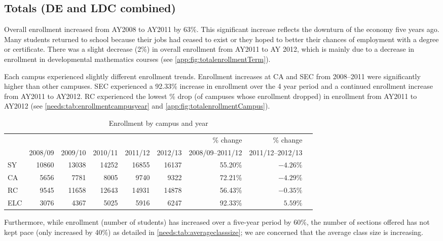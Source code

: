 \subsection{Totals (DE and LDC combined)}
Overall enrollment increased from AY2008 to AY2011 by 63\%.
This significant increase reflects the downturn of the economy five years ago.
Many students returned to school because their jobs had ceased to exist or they hoped to better their chances of employment with a degree or certificate.
There was a slight decrease (2\%) in overall enrollment from AY2011 to AY 2012, which is mainly due to a decrease in enrollment in developmental mathematics courses (see \vref{app:fig:totalenrollmentTerm}).

Each campus experienced slightly different enrollment trends.
Enrollment increases at CA and SEC from 2008--2011 were significantly higher than other campuses.
SEC experienced a 92.33\% increase in enrollment over the 4 year period and a continued enrollment increase from AY2011 to AY2012.
RC experienced the lowest \% drop (of campuses whose enrollment dropped)  in enrollment from AY2011 to AY2012 (see \vref{needs:tab:enrollmentcampusyear} and \vref{app:fig:totalenrollmentCampus}).

\begin{table}[!htb]
	\centering
	\caption{Enrollment by campus and year}
	\label{needs:tab:enrollmentcampusyear}
	\begin{tabularx}{\linewidth}{l*{8}{R}}
		\toprule
		    &         &         &         &         &         & \% change        & \% change        \\
		    & 2008/09 & 2009/10 & 2010/11 & 2011/12 & 2012/13 & 2008/09--2011/12 & 2011/12--2012/13 \\
		\midrule
		SY  & 10860   & 13038   & 14252   & 16855   & 16137   & 55.20\%          & $-4.26\%$        \\
		CA  & 5656    & 7781    & 8005    & 9740    & 9322    & 72.21\%          & $-4.29\%$        \\
		RC  & 9545    & 11658   & 12643   & 14931   & 14878   & 56.43\%          & $-0.35\%$        \\
		ELC & 3076    & 4367    & 5025    & 5916    & 6247    & 92.33\%          & $5.59\%$         \\
		\bottomrule
	\end{tabularx}
\end{table}

Furthermore, while enrollment (number of students) has increased over a five-year period by 60\%, the number of sections offered has not kept pace (only increased by 40\%) as detailed in \cref{needs:tab:averageclasssize}; we are concerned that the average class size is increasing.

